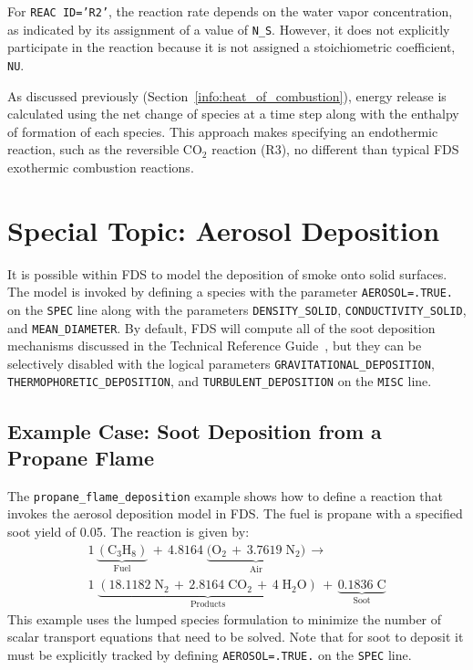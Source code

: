 \documentclass[11pt]{book}
\newcommand{\ct}{\tt\small}
\begin{document}
\noindent For {\ct REAC ID='R2'}, the reaction rate depends on the water vapor concentration, as indicated by its assignment of a value of {\ct N\_S}. However, it does not explicitly participate in the reaction because it is not assigned a stoichiometric coefficient, {\ct NU}.

As discussed previously (Section~\ref{info:heat_of_combustion}), energy release is calculated using the net change of species at a time step along with the enthalpy of formation of each species. This approach makes specifying an endothermic reaction, such as the reversible CO$_2$ reaction (R3), no different than typical FDS exothermic combustion reactions.


\newpage

\section{Special Topic: Aerosol Deposition}
\label{info:deposition}

It is possible within FDS to model the deposition of smoke onto solid surfaces. The model is invoked by defining a species with the parameter {\ct AEROSOL=.TRUE.} on the {\ct SPEC} line along with the parameters {\ct DENSITY\_SOLID}, {\ct CONDUCTIVITY\_SOLID}, and {\ct MEAN\_DIAMETER}. By default, FDS will compute all of the soot deposition mechanisms discussed in the Technical Reference Guide~\cite{FDS_Math_Guide}, but they can be selectively disabled with the logical parameters {\ct GRAVITATIONAL\_DEPOSITION}, {\ct THERMOPHORETIC\_DEPOSITION}, and {\ct TURBULENT\_DEPOSITION} on the {\ct MISC} line.

\subsection{Example Case: Soot Deposition from a Propane Flame}

The {\ct propane\_flame\_deposition} example shows how to define a reaction that invokes the aerosol deposition model in FDS. The fuel is propane with a specified soot yield of 0.05. The reaction is given by:
\begin{eqnarray}\label{eq:PROPANE_depo}
1\,\underbrace{\mathrm{(C_3H_8)}}_\text{Fuel} \,+\, 4.8164 \; \underbrace{\mathrm{(O_2\,+\, 3.7619 \; N_2})}_\text{Air} \, \rightarrow \\
\nonumber 1 \; \underbrace{\mathrm{(18.1182 \; N_2 \, + \, 2.8164 \; CO_2 \,+ \, 4\; H_2O)}}_\text{Products} \,+\,
\underbrace{0.1836 \; \mathrm{C}}_\text{Soot}
\end{eqnarray}
This example uses the lumped species formulation to minimize the number of scalar transport equations that need to be solved. Note that for soot to deposit it must be explicitly tracked by defining {\ct AEROSOL=.TRUE.} on the {\ct SPEC} line.
\end{document}
